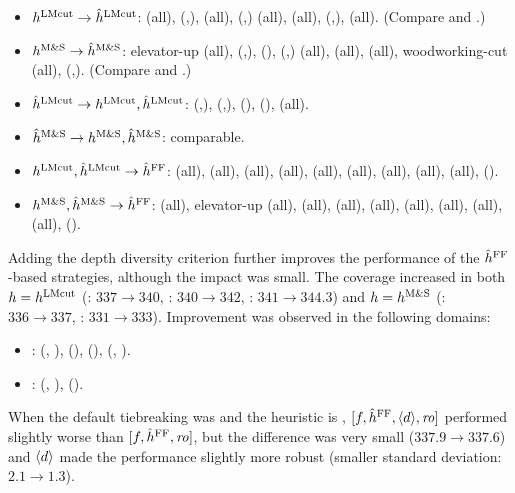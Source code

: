 \begin{itemize}
 \item \textbf{$h^\text{LMcut} \to \hat{h}^\text{LMcut}$}:  (all),  (\fifo,\ro),  (all),  (\lifo,\ro)  (all),  (all),  (\lifo,\ro),  (all). (Compare  and .)
 \item \textbf{$h^\text{M\&S} \to \hat{h}^\text{M\&S}$}: elevator-up (all),  (\fifo,\ro),  (\ro),  (\fifo,\lifo)  (all),  (all),  (all), wood\-working-cut (all),  (\lifo,\ro). (Compare  and .)
 \item \textbf{$\hat{h}^\text{LMcut} \to h^\text{LMcut},\hat{h}^\text{LMcut}$}:  (\fifo,\ro),  (\fifo,\ro),  (\lifo),  (\fifo),  (all).
 \item \textbf{$\hat{h}^\text{M\&S} \to h^\text{M\&S},\hat{h}^\text{M\&S}$}: comparable.
 \item \textbf{$h^\text{LMcut},\hat{h}^\text{LMcut} \to \hat{h}^{\text{FF}}$}:  (all),  (all),  (all),  (all),  (all),  (all),  (all),  (all),  (all),  (\ro).
 \item \textbf{$h^\text{M\&S},\hat{h}^\text{M\&S} \to \hat{h}^{\text{FF}}$}:  (all), elevator-up (all),  (all),  (all),  (all),  (all),  (all),  (all),  (all),  (\ro).
\end{itemize}
 
Adding the depth diversity criterion further improves the performance of the $\hat{h}^{\text{FF}}$-based strategies,
 although the impact was small.
The coverage increased in both
 $h=h^\text{LMcut}$ (\fifo: $337\rightarrow 340$, \lifo: $340\rightarrow 342$, \ro: $341\rightarrow 344.3$) and
 $h=h^\text{M\&S}$ (\fifo: $336\rightarrow 337$, \lifo: $331\rightarrow 333$).
Improvement was observed in the following domains:
\begin{itemize}
 \item \textbf{\lmcut}:  (\lifo, \ro),  (\ro),  (\fifo),  (\fifo, \ro).
 \item \textbf{\mands}:  (\lifo, \ro),  (\fifo).
\end{itemize}
When the default tiebreaking was \ro and the heuristic is \mands, $[f,\hat{h}^{\text{FF}},{\left<d\right>},{\text{\textit{ro}}}]$ performed slightly worse than 
$[f,\hat{h}^{\text{FF}},{\text{\textit{ro}}}]$, but the difference was very small  ($337.9\rightarrow 337.6$) and ${\left<d\right>}$ made the performance slightly more robust (smaller standard deviation: $2.1\rightarrow 1.3$).

